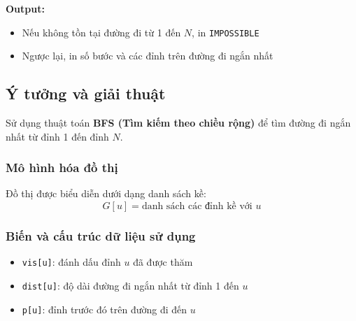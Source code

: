 \documentclass{article}
\begin{document}
	\textbf{Output:}
	\begin{itemize}
		\item Nếu không tồn tại đường đi từ 1 đến \( N \), in \texttt{IMPOSSIBLE}
		\item Ngược lại, in số bước và các đỉnh trên đường đi ngắn nhất
	\end{itemize}
	
	\subsection*{Ý tưởng và giải thuật}
	Sử dụng thuật toán \textbf{BFS (Tìm kiếm theo chiều rộng)} để tìm đường đi ngắn nhất từ đỉnh 1 đến đỉnh \( N \).
	
	\subsubsection{Mô hình hóa đồ thị}
	Đồ thị được biểu diễn dưới dạng danh sách kề:
	\[
	G[u] = \text{danh sách các đỉnh kề với } u
	\]
	
	\subsubsection{Biến và cấu trúc dữ liệu sử dụng}
	\begin{itemize}
		\item \texttt{vis[u]}: đánh dấu đỉnh \( u \) đã được thăm
		\item \texttt{dist[u]}: độ dài đường đi ngắn nhất từ đỉnh 1 đến \( u \)
		\item \texttt{p[u]}: đỉnh trước đó trên đường đi đến \( u \)
	\end{itemize}
	
\end{document}
